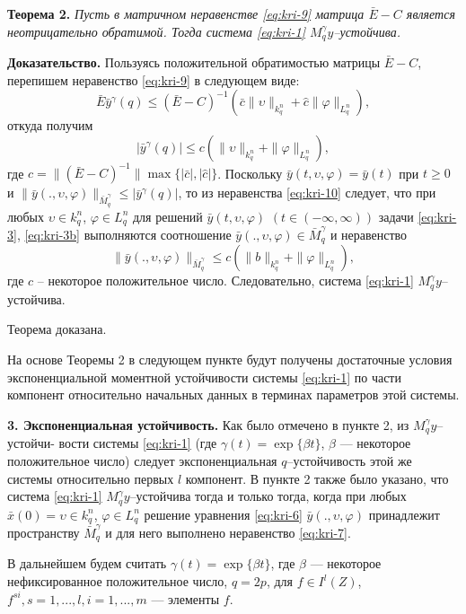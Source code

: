 \textbf {Теорема 2.} {\it Пусть в матричном неравенстве \eqref{eq:kri-9} матрица
$\bar E - C$ является неотрицательно обратимой. Тогда система \eqref{eq:kri-1}
$M_q^\gamma y$--устойчива.}

{\bf Доказательство.} Пользуясь положительной обратимостью матрицы
$\bar E - C$, перепишем неравенство \eqref{eq:kri-9} в следующем виде:
$$
\bar E\bar y^\gamma (q) \leq (\bar E - C)^{-1}\left(\bar
c\|\upsilon\|_{k^n_{q}} + \hat c \|\varphi \|_{L^n_q}  \right),
$$
откуда получим
\begin{equation}
    \label{eq:kri-10}
    |\bar y^\gamma (q)| \leq c\left (\|\upsilon\|_{k^n_{q}}+ \|\varphi
    \|_{L^n_q}\right ),
\end{equation}
где $c =\|(\bar E - C)^{-1}\|\max \{|\bar c|, |\hat c|\}$. Поскольку
$\bar y(t,\upsilon,\varphi) = \bar y(t)$  при $t \geq 0$ и $\|\bar
y(.,\upsilon,\varphi)\|_{\bar M_q^\gamma} \leq |\bar y^\gamma (q)|$,
то из неравенства \eqref{eq:kri-10} следует, что при любых $\upsilon \in k^n_q$,
$\varphi \in L^n_q$ для решений $\bar y(t, \upsilon, \varphi)$ $(t
\in (-\infty, \infty))$ задачи \eqref{eq:kri-3}, \eqref{eq:kri-3b} выполняются соотношение
$\bar y(., \upsilon, \varphi) \in \bar M_q^\gamma$ и неравенство
$$
\|\bar y(., \upsilon, \varphi)\|_{\bar M_q^\gamma} \le
c(\|b\|_{k^n_q} + \|\varphi \|_{L^n_q}),
$$
где $c$ -- некоторое положительное число. Следовательно,  система
\eqref{eq:kri-1} $M_q^\gamma y$--устойчива.

Теорема доказана.

На основе Теоремы 2 в следующем пункте будут получены достаточные
условия экспоненциальной моментной устойчивости системы \eqref{eq:kri-1} по части
компонент относительно начальных данных в терминах параметров этой
системы.
\smallskip

\textbf {3. Экспоненциальная устойчивость.} Как было отмечено в
пункте 2, из $M_q^\gamma y$--устойчи- вости системы \eqref{eq:kri-1} (где $\gamma
(t) = \exp \{\beta t\}$, $\beta$ --- некоторое положительное число)
следует экспоненциальная $q$--устойчивость этой же системы
относительно первых $l$ компонент. В пункте 2 также было указано,
что система \eqref{eq:kri-1} $M_q^\gamma y$--устойчива тогда и только тогда,
когда при любых $\bar x(0) = \upsilon \in k^n_q$, $\varphi \in
L^n_q$ решение уравнения \eqref{eq:kri-6} $\bar y(., \upsilon, \varphi)$
принадлежит пространству $\bar M_q^\gamma $ и для него выполнено
неравенство \eqref{eq:kri-7}.

В дальнейшем будем считать $\gamma (t) = \exp \{\beta t\}$, где
$\beta$ --- некоторое  нефиксированное положительное число, $q =
2p$, для  $f \in I^l(Z)$,
 $f^{si}, s = 1,...,l, i = 1,...,m$ --- элементы $f$.

